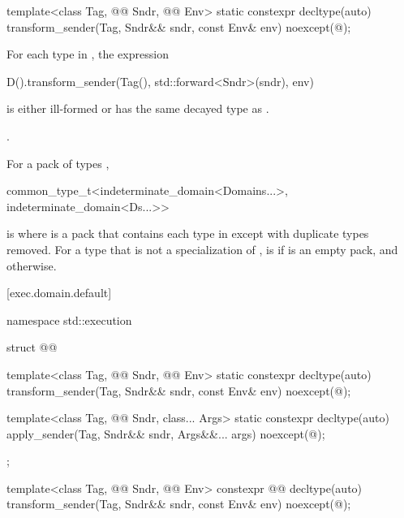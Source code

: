 %
\begin{itemdecl}
template<class Tag, @@ Sndr, @@ Env>
  static constexpr decltype(auto) transform_sender(Tag, Sndr&& sndr, const Env& env)
    noexcept(@\seebelow@);
\end{itemdecl}

\begin{itemdescr}
\pnum
\mandates
For each type  in ,
the expression
\begin{codeblock}
D().transform_sender(Tag(), std::forward<Sndr>(sndr), env)
\end{codeblock}
is either ill-formed or has the same decayed type as
.

\pnum
\returns
{}.

\pnum
\remarks
For a pack of types ,
\begin{codeblock}
common_type_t<indeterminate_domain<Domains...>, indeterminate_domain<Ds...>>
\end{codeblock}
is 
where  is a pack that contains each type in
 except with duplicate types removed.
For a type  that is not a specialization of ,
is  if  is an empty pack, and
otherwise.
\end{itemdescr}

[exec.domain.default]{}

\pnum
\begin{codeblock}
namespace std::execution {
  struct @@ {
    template<class Tag, @@ Sndr, @@ Env>
      static constexpr decltype(auto) transform_sender(Tag, Sndr&& sndr, const Env& env)
        noexcept(@\seebelow@);

    template<class Tag, @@ Sndr, class... Args>
      static constexpr decltype(auto) apply_sender(Tag, Sndr&& sndr, Args&&... args)
        noexcept(@\seebelow@);
  };
}
\end{codeblock}

%
\begin{itemdecl}
template<class Tag, @@ Sndr, @@ Env>
constexpr @@ decltype(auto) transform_sender(Tag, Sndr&& sndr, const Env& env)
  noexcept(@\seebelow@);
\end{itemdecl}

